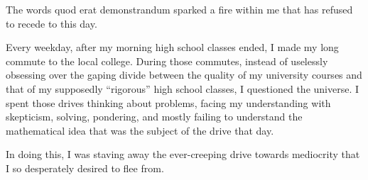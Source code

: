 \documentclass[12pt]{article}
\begin{document}
The words quod erat demonstrandum sparked a fire within me that has refused to recede to this day.

Every weekday, after my morning high school classes ended, I made my long commute to the local college. During those commutes, instead of uselessly obsessing over the gaping divide between the quality of my university courses and that of my supposedly ``rigorous'' high school classes, I questioned the universe. I spent those drives thinking about problems, facing my understanding with skepticism, solving, pondering, and mostly failing to understand the mathematical idea that was the subject of the drive that day.

In doing this, I was staving away the ever-creeping drive towards mediocrity that I so desperately desired to flee from.
\end{document}
